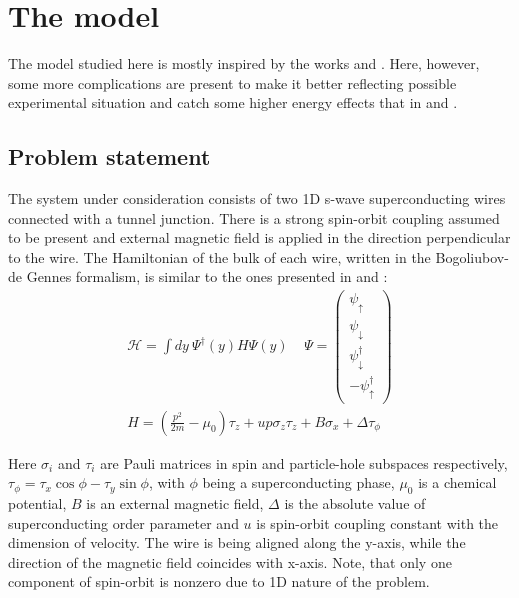 \newcommand{\xbr}{\left(x\right)}
\newcommand{\br}[1]{\left(#1\right)}
\newcommand{\abs}[1]{\left|#1\right|}
\newcommand{\pdy}{\partial_y}
\newcommand{\pd}[1]{\partial_{#1}}
\newcommand{\brf}[1]{\left\{#1\right\}}

\chapter{The model}
\label{chap:model}

The model studied here is mostly inspired by the works \cite{Oreg_2010} and \cite{Lutchyn_2010}. Here, however, some more complications are present to make it better reflecting possible experimental situation and catch some higher energy effects that in \cite{Oreg_2010} and \cite{Lutchyn_2010}. 
\section{Problem statement}

The system under consideration consists of two 1D s-wave superconducting wires connected with a tunnel junction. There is a strong spin-orbit coupling assumed to be present and external magnetic field is applied in the direction perpendicular to the wire. The Hamiltonian of the bulk of each wire, written in the Bogoliubov-de Gennes formalism, is similar to the ones presented in \cite{Oreg_2010} and \cite{Lutchyn_2010}:
\begin{gather}
	\mathcal{H}
	=
	\int dy ~
	\Psi^\dagger
	\br{y}
	H
	\Psi
	\br{y}
	\
	~~~~
	\Psi
	=
	\begin{pmatrix}
		\psi_\uparrow
		\\
		\psi_\downarrow
		\\
		\psi_\downarrow^\dagger
		\\
		-\psi_\uparrow^\dagger
	\end{pmatrix}
	\\
	\label{bulk_Hamiltonian}
	H
	=
	\br{
		\frac{p^2}{2m}
		-\mu_0
	}\tau_z
	+
	u p \sigma_z \tau_z
	+
	B\sigma_x	
	+
	\Delta\tau_\phi
\end{gather}

Here $ \sigma_i $ and $ \tau_i $ are Pauli matrices in spin and particle-hole subspaces respectively, $ \tau_\phi = \tau_x \cos\phi - \tau_y \sin\phi$, with $ \phi $ being a superconducting phase, $ \mu_0 $ is a chemical potential, $ B $ is an external magnetic field, $ \Delta $ is the absolute value of superconducting order parameter and $ u $ is spin-orbit coupling constant with the dimension of velocity. The wire is being aligned along the y-axis, while the direction of the magnetic field coincides with x-axis. Note, that only one component of spin-orbit is nonzero due to 1D nature of the problem.

